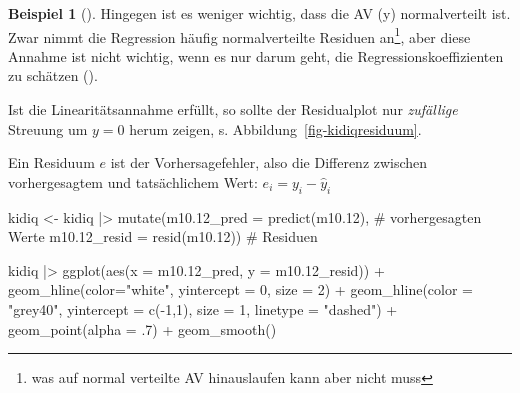 \documentclass[
  ngerman,
  letterpaper,
  twoside,
  open=any]{scrbook}
\newenvironment{Shaded}{\begin{snugshade}}{\end{snugshade}}
\newcommand{\AttributeTok}[1]{\textcolor[rgb]{0.40,0.45,0.13}{#1}}
\newcommand{\CommentTok}[1]{\textcolor[rgb]{0.37,0.37,0.37}{#1}}
\newcommand{\DecValTok}[1]{\textcolor[rgb]{0.68,0.00,0.00}{#1}}
\newcommand{\FloatTok}[1]{\textcolor[rgb]{0.68,0.00,0.00}{#1}}
\newcommand{\FunctionTok}[1]{\textcolor[rgb]{0.28,0.35,0.67}{#1}}
\newcommand{\NormalTok}[1]{\textcolor[rgb]{0.00,0.23,0.31}{#1}}
\newcommand{\OtherTok}[1]{\textcolor[rgb]{0.00,0.23,0.31}{#1}}
\newcommand{\SpecialCharTok}[1]{\textcolor[rgb]{0.37,0.37,0.37}{#1}}
\newcommand{\StringTok}[1]{\textcolor[rgb]{0.13,0.47,0.30}{#1}}
\theoremstyle{definition}
\newtheorem{example}{Beispiel}[chapter]
\theoremstyle{plain}
\theoremstyle{definition}
\theoremstyle{definition}
\theoremstyle{remark}
\begin{document}
\begin{example}[]
Hingegen ist es weniger wichtig, dass die AV (y) normalverteilt ist.
Zwar nimmt die Regression häufig normalverteilte Residuen an\footnote{was
  auf normal verteilte AV hinauslaufen kann aber nicht muss}, aber diese
Annahme ist nicht wichtig, wenn es nur darum geht, die
Regressionskoeffizienten zu schätzen ().

Ist die Linearitätsannahme erfüllt, so sollte der Residualplot nur
\emph{zufällige} Streuung um \(y=0\) herum zeigen, s.
Abbildung~\ref{fig-kidiqresiduum}.

Ein Residuum \(e\) ist der Vorhersagefehler, also die Differenz zwischen
vorhergesagtem und tatsächlichem Wert: \(e_i = y_i - \hat{y}_i\)

\begin{Shaded}
\begin{Highlighting}[]
\NormalTok{kidiq }\OtherTok{\textless{}{-}}
\NormalTok{  kidiq }\SpecialCharTok{|\textgreater{}} 
  \FunctionTok{mutate}\NormalTok{(}\AttributeTok{m10.12\_pred =} \FunctionTok{predict}\NormalTok{(m10}\FloatTok{.12}\NormalTok{),  }\CommentTok{\# vorhergesagten Werte}
         \AttributeTok{m10.12\_resid =} \FunctionTok{resid}\NormalTok{(m10}\FloatTok{.12}\NormalTok{))  }\CommentTok{\# Residuen}
\end{Highlighting}
\end{Shaded}

\begin{Shaded}
\begin{Highlighting}[]
\NormalTok{kidiq }\SpecialCharTok{|\textgreater{}} 
  \FunctionTok{ggplot}\NormalTok{(}\FunctionTok{aes}\NormalTok{(}\AttributeTok{x =}\NormalTok{ m10}\FloatTok{.12}\NormalTok{\_pred, }\AttributeTok{y =}\NormalTok{ m10}\FloatTok{.12}\NormalTok{\_resid)) }\SpecialCharTok{+}
  \FunctionTok{geom\_hline}\NormalTok{(}\AttributeTok{color=}\StringTok{"white"}\NormalTok{, }\AttributeTok{yintercept =} \DecValTok{0}\NormalTok{, }\AttributeTok{size =} \DecValTok{2}\NormalTok{) }\SpecialCharTok{+}
  \FunctionTok{geom\_hline}\NormalTok{(}\AttributeTok{color =} \StringTok{"grey40"}\NormalTok{, }
             \AttributeTok{yintercept =} \FunctionTok{c}\NormalTok{(}\SpecialCharTok{{-}}\DecValTok{1}\NormalTok{,}\DecValTok{1}\NormalTok{), }
             \AttributeTok{size =} \DecValTok{1}\NormalTok{, }
             \AttributeTok{linetype =} \StringTok{"dashed"}\NormalTok{) }\SpecialCharTok{+}
  \FunctionTok{geom\_point}\NormalTok{(}\AttributeTok{alpha =}\NormalTok{ .}\DecValTok{7}\NormalTok{) }\SpecialCharTok{+}
  \FunctionTok{geom\_smooth}\NormalTok{()}
\end{Highlighting}
\end{Shaded}


\end{example}
\end{document}
